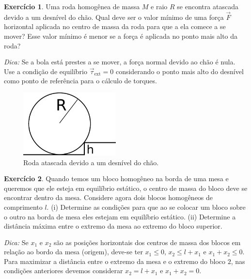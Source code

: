 \documentclass[papersize=a4,DIV=calc,twocolumn=on]{scrartcl}
\theoremstyle{definition}
\newtheorem{ex}{Exercício}[section]
\begin{document}
\begin{ex}
  Uma roda homogênea de massa $M$ e raio $R$ se encontra atascada
  devido a um desnível do chão. Qual deve ser o valor mínimo de uma
  força $\vec F$ horizontal aplicada no centro de massa da roda para
  que a ela comece a se mover? Esse valor mínimo é menor se a força é
  aplicada no ponto mais alto da roda?

  \noindent\textit{Dica:} Se a bola está prestes a se mover, a força
  normal devido ao chão é nula. Use a condição de equilíbrio
  $\vec\tau_{\mathrm{ext}}=0$ considerando o ponto mais alto do
  desnível como ponto de referência para o cálculo de torques.
  \begin{figure}[ht]
    \centering
    \includegraphics[width=0.45\textwidth,keepaspectratio]{roda_obstaculo.pdf}
    \caption{Roda atascada devido a um desnível do chão.}
    \label{fig:roda_obstaculo}
  \end{figure}
\end{ex}

\begin{ex}
  Quando temos um bloco homogêneo na borda de uma mesa e queremos que
  ele esteja em equilíbrio estático, o centro de massa do bloco deve
  se encontrar dentro da mesa. Considere agora dois blocos homogêneos
  de comprimento $l$. (i) Determine as condições para que ao se
  colocar um bloco sobre o outro na borda de mesa eles estejam em
  equilíbrio estático. (ii) Determine a distância máxima entre o
  extremo da mesa ao extremo do bloco superior.

  \noindent\textit{Dica:} Se $x_1$ e $x_2$ são as posições horizontais
  dos centros de massa dos blocos em relação ao bordo da mesa
  (origem), deve-se ter $x_1\le 0$, $x_2\le l+x_1$ e $x_1+x_2\le
  0$. Para maximizar a distância entre o extremo da mesa e o extremo
  do bloco $2$, nas condições anteriores devemos considerar
  $x_2=l+x_1$ e $x_1+x_2=0$.
\end{ex}
\end{document}
